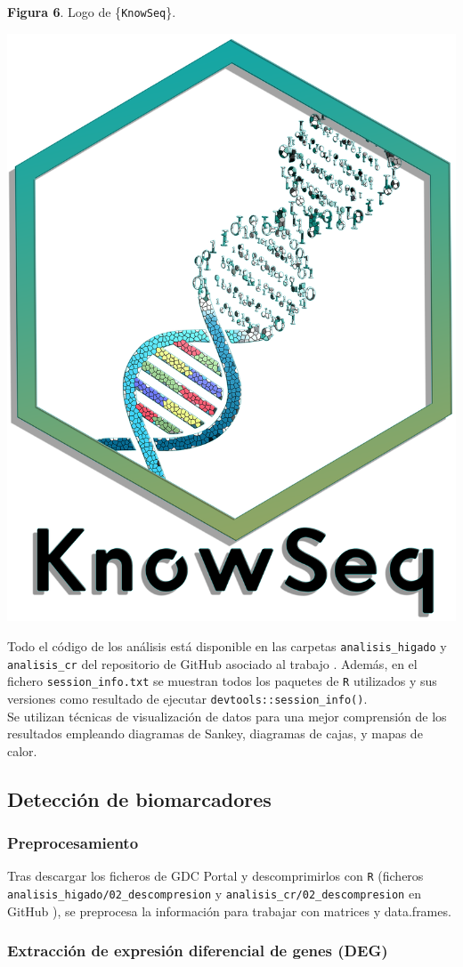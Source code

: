 \textbf{Figura 6}. Logo de \{\texttt{KnowSeq}\}.
\begin{center}
	\includegraphics[width=.3\textwidth]{figuras/06_logo_knowseq.png} 
\end{center}

Todo el código de los análisis está disponible en las carpetas \texttt{analisis\_higado} y \texttt{analisis\_cr} del repositorio de GitHub asociado al trabajo \cite{Redondo-Sanchez2020}. Además, en el fichero \texttt{session\_info.txt} se muestran todos los paquetes de \texttt{R} utilizados y sus versiones como resultado de ejecutar \texttt{devtools::session\_info()}.\\

Se utilizan técnicas de visualización de datos para una mejor comprensión de los resultados empleando diagramas de Sankey, diagramas de cajas, y mapas de calor.

\subsection{Detección de biomarcadores}

\subsubsection{Preprocesamiento}

Tras descargar los ficheros de GDC Portal y descomprimirlos con \texttt{R} (ficheros \texttt{analisis\_higado/02\_descompresion} y \texttt{analisis\_cr/02\_descompresion}  en GitHub \cite{Redondo-Sanchez2020}), se preprocesa la información para trabajar con matrices y data.frames.

\subsubsection{Extracción de expresión diferencial de genes (DEG)}

